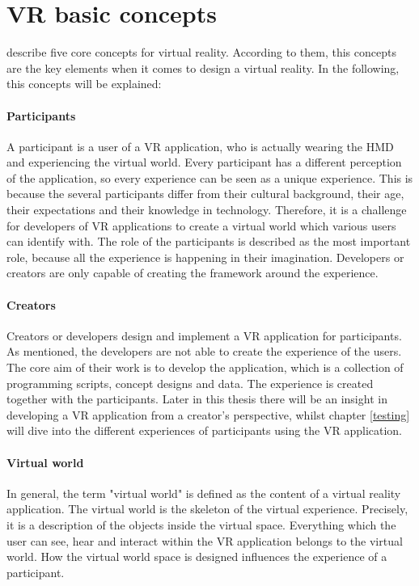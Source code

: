 \newpage
\section{VR basic concepts}
\cite{Sherman.2019} describe five core concepts for virtual reality.  According to them, this concepts are the key elements when it comes to design a virtual reality. In the following, this concepts will be explained:
\paragraph{Participants} A participant is a user of a VR application, who is actually wearing the HMD and experiencing the virtual world. Every participant has a different perception of the application, so every experience can be seen as a unique experience. This is because the several participants differ from their cultural background, their age, their expectations and their knowledge in technology. Therefore, it is a challenge for developers of VR applications to create a virtual world which various users can identify with. The role of the participants is described as the most important role, because all the experience is happening in their imagination. Developers or creators are only capable of creating the framework around the experience.
\paragraph{Creators} Creators or developers design and implement a VR application for participants. As mentioned, the developers are not able to create the experience of the users. The core aim of their work is to develop the application, which is a collection of programming scripts, concept designs and data. The experience is created together with the participants. Later in this thesis there will be an insight in developing a VR application from a creator's perspective, whilst chapter \ref{testing} will dive into the different experiences of participants using the VR application.
\paragraph{Virtual world} In general, the term "virtual world" is defined as the content of a virtual reality application.  The virtual world is the skeleton of the virtual experience. Precisely, it is a description of the objects inside the virtual space. Everything which the user can see, hear and interact within the VR application belongs to the virtual world. How the virtual world space is designed influences the experience of a participant.


